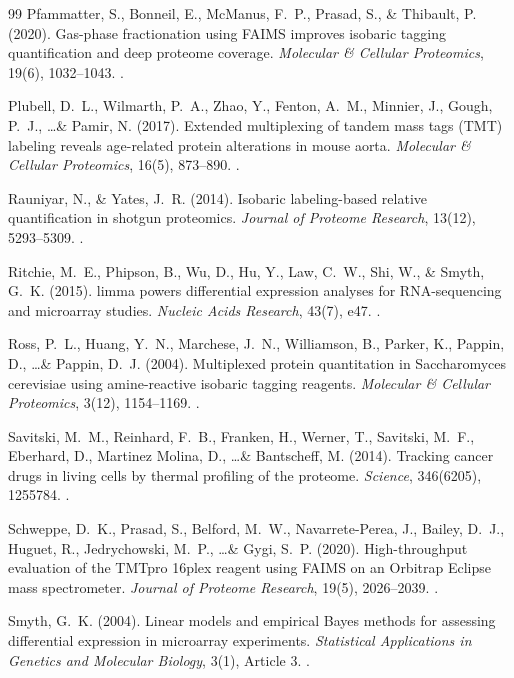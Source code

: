 \documentclass[11pt,oneside]{book}
\begin{document}
\begin{thebibliography}{99}
Pfammatter, S., Bonneil, E., McManus, F.~P., Prasad, S., \& Thibault, P. (2020). Gas-phase fractionation using FAIMS improves isobaric tagging quantification and deep proteome coverage. \textit{Molecular \& Cellular Proteomics}, 19(6), 1032--1043. .

Plubell, D.~L., Wilmarth, P.~A., Zhao, Y., Fenton, A.~M., Minnier, J., Gough, P.~J., \dots \& Pamir, N. (2017). Extended multiplexing of tandem mass tags (TMT) labeling reveals age-related protein alterations in mouse aorta. \textit{Molecular \& Cellular Proteomics}, 16(5), 873--890. .

Rauniyar, N., \& Yates, J.~R. (2014). Isobaric labeling-based relative quantification in shotgun proteomics. \textit{Journal of Proteome Research}, 13(12), 5293--5309. .

Ritchie, M.~E., Phipson, B., Wu, D., Hu, Y., Law, C.~W., Shi, W., \& Smyth, G.~K. (2015). limma powers differential expression analyses for RNA-sequencing and microarray studies. \textit{Nucleic Acids Research}, 43(7), e47. .

Ross, P.~L., Huang, Y.~N., Marchese, J.~N., Williamson, B., Parker, K., Pappin, D., \dots \& Pappin, D.~J. (2004). Multiplexed protein quantitation in Saccharomyces cerevisiae using amine-reactive isobaric tagging reagents. \textit{Molecular \& Cellular Proteomics}, 3(12), 1154--1169. .

Savitski, M.~M., Reinhard, F.~B., Franken, H., Werner, T., Savitski, M.~F., Eberhard, D., Martinez Molina, D., \dots \& Bantscheff, M. (2014). Tracking cancer drugs in living cells by thermal profiling of the proteome. \textit{Science}, 346(6205), 1255784. .

Schweppe, D.~K., Prasad, S., Belford, M.~W., Navarrete-Perea, J., Bailey, D.~J., Huguet, R., Jedrychowski, M.~P., \dots \& Gygi, S.~P. (2020). High-throughput evaluation of the TMTpro 16plex reagent using FAIMS on an Orbitrap Eclipse mass spectrometer. \textit{Journal of Proteome Research}, 19(5), 2026--2039. .

Smyth, G.~K. (2004). Linear models and empirical Bayes methods for assessing differential expression in microarray experiments. \textit{Statistical Applications in Genetics and Molecular Biology}, 3(1), Article 3. .


\end{thebibliography}
\end{document}
